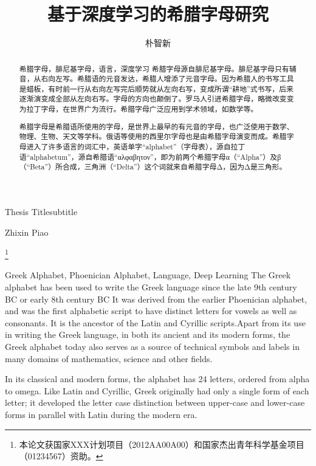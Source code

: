 \documentclass[bachelor,nocolorlinks]{seuthesis} %
\begin{document}

\title{基于深度学习的希腊字母研究}{}{Thesis Title}{subtitle}
\author{朴智新}{Zhixin Piao}

\address{河海院2楼}
\thanks{本论文获国家XXX计划项目（2012AA00A00）和国家杰出青年科学基金项目（01234567）资助。}
\maketitle


\begin{abstract}{希腊字母，腓尼基字母，语言，深度学习}
希腊字母源自腓尼基字母。腓尼基字母只有辅音，从右向左写。希腊语的元音发达，希腊人增添了元音字母。因为希腊人的书写工具是蜡板，有时前一行从右向左写完后顺势就从左向右写，变成所谓“耕地”式书写，后来逐渐演变成全部从左向右写。字母的方向也颠倒了。罗马人引进希腊字母，略微改变变为拉丁字母，在世界广为流行。希腊字母广泛应用到学术领域，如数学等。

希腊字母是希腊语所使用的字母，是世界上最早的有元音的字母，也广泛使用于数学、物理、生物、天文等学科。俄语等使用的西里尔字母也是由希腊字母演变而成。希腊字母进入了许多语言的词汇中，英语单字“alphabet”（字母表），源自拉丁语“alphabetum”，源自希腊语“αλφαβητον”，即为前两个希腊字母α（“Alpha”）及β（“Beta”）所合成，三角洲（“Delta”）这个词就来自希腊字母Δ，因为Δ是三角形。
\end{abstract}

\begin{englishabstract}{Greek Alphabet, Phoenician Alphabet, Language, Deep Learning}
The Greek alphabet has been used to write the Greek language since the late 9th century BC or early 8th century BC It was derived from the earlier Phoenician alphabet, and was the first alphabetic script to have distinct letters for vowels as well as consonants. It is the ancestor of the Latin and Cyrillic scripts.Apart from its use in writing the Greek language, in both its ancient and its modern forms, the Greek alphabet today also serves as a source of technical symbols and labels in many domains of mathematics, science and other fields.

In its classical and modern forms, the alphabet has 24 letters, ordered from alpha to omega. Like Latin and Cyrillic, Greek originally had only a single form of each letter; it developed the letter case distinction between upper-case and lower-case forms in parallel with Latin during the modern era.
\end{englishabstract}
\end{document}
